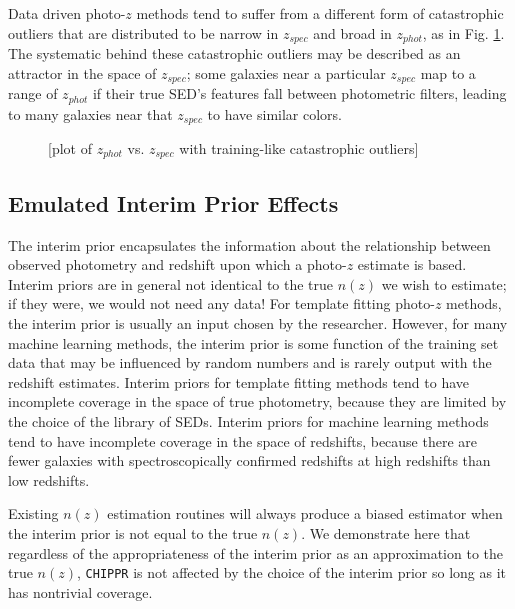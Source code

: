 \documentclass[iop]{emulateapj}
\newcommand{\chippr}{\texttt{CHIPPR} }
\begin{document}
Data driven photo-$z$ methods tend to suffer from a different form of 
catastrophic outliers that are distributed to be narrow in $z_{spec}$ and broad 
in $z_{phot}$, as in Fig. \ref{fig:traincatout}.  The systematic behind these 
catastrophic outliers may be described as an attractor in the space of 
$z_{spec}$; some galaxies near a particular $z_{spec}$ map to a range of 
$z_{phot}$ if their true SED's features fall between photometric filters, 
leading to many galaxies near that $z_{spec}$ to have similar colors.

\begin{figure}
	\begin{center}
		\caption{[plot of $z_{phot}$ vs. $z_{spec}$ with training-like 
catastrophic outliers]}
		\label{fig:traincatout}
	\end{center}
\end{figure}

\subsection{Emulated Interim Prior Effects}
\label{sec:priors}

The interim prior encapsulates the information about the relationship between 
observed photometry and redshift upon which a photo-$z$ estimate is based.  
Interim priors are in general not identical to the true $n(z)$ we wish to 
estimate; if they were, we would not need any data!  For template fitting 
photo-$z$ methods, the interim prior is usually an input chosen by the 
researcher.  However, for many machine learning methods, the interim prior is 
some function of the training set data that may be influenced by random numbers 
and is rarely output with the redshift estimates.  Interim priors for template 
fitting methods tend to have incomplete coverage in the space of true 
photometry, because they are limited by the choice of the library of SEDs.  
Interim priors for machine learning methods tend to have incomplete coverage in 
the space of redshifts, because there are fewer galaxies with spectroscopically 
confirmed redshifts at high redshifts than low redshifts.

Existing $n(z)$ estimation routines will always produce a biased estimator when 
the interim prior is not equal to the true $n(z)$.  We demonstrate here that 
regardless of the appropriateness of the interim prior as an approximation to 
the true $n(z)$, \chippr is not affected by the choice of the interim prior so 
long as it has nontrivial coverage.
\end{document}
